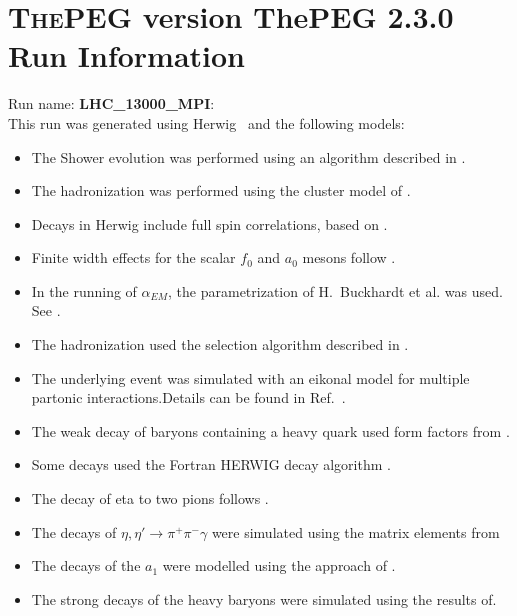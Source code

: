 \documentclass{article}
\begin{document}
\appendix
\section[xxx]{\textsc{ThePEG} version ThePEG 2.3.0 \cite{ThePEG} Run Information}
Run name: \textbf{LHC_13000_MPI}:\\
This run was generated using Herwig~\cite{Bahr:2008pv} and the following models:
\begin{itemize}
\item The Shower evolution was performed using an algorithm described in \cite{Bahr:2008pv,Marchesini:1983bm,Marchesini:1987cf,Gieseke:2003rz,Masouminia:2021kne}.
\item The hadronization was performed using the cluster model of \cite{Webber:1983if}.
\item Decays in Herwig include full spin correlations, based on \cite{Richardson:2001df}.
\item Finite width effects for the scalar $f_0$ and $a_0$ mesons follow \cite{Flatte:1976xu}.
\item In the running of $\alpha_{EM}$, the parametrization of H.~Buckhardt et al. was used. See \cite{KLEISSCERN9808v3pp129}.
\item The hadronization used the selection algorithm described in \cite{Kupco:1998fx}.
\item The underlying event was simulated with an eikonal model for multiple partonic interactions.Details can be found in Ref.~\cite{Bahr:2008dy,Bahr:2009ek}.
\item The weak decay of baryons containing a heavy quark used form factors from \cite{Cheng:1995fe,Cheng:1996cs}.
\item Some decays used the Fortran HERWIG decay algorithm \cite{Corcella:2000bw}.
\item The decay of eta to two pions follows \cite{Beisert:2003zs,Gormley:1970qz,Tippens:2001fm}.
\item The decays of $\eta,\eta'\to\pi^+\pi^-\gamma$ were simulated using the matrix elements from \cite{Venugopal:1998fq,Holstein:2001bt}
\item The decays of the $a_1$ were modelled using the approach of \cite{Kuhn:1990ad}.

\item The strong decays of the heavy baryons were simulated using the results of\cite{Ivanov:1999bk}.
\end{itemize}
\end{document}
